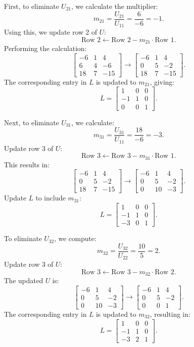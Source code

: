 \documentclass[12pt]{article}
\begin{document}
\begin{enumerate}
First, to eliminate \( U_{21} \), we calculate the multiplier:
\[
m_{21} = \frac{U_{21}}{U_{11}} = \frac{6}{-6} = -1.
\]
Using this, we update row 2 of \( U \):
\[
\text{Row 2} \leftarrow \text{Row 2} - m_{21} \cdot \text{Row 1}.
\]
Performing the calculation:
\[
\begin{bmatrix}
-6 & 1 & 4 \\
6 & 4 & -6 \\
18 & 7 & -15
\end{bmatrix}
\longrightarrow
\begin{bmatrix}
-6 & 1 & 4 \\
0 & 5 & -2 \\
18 & 7 & -15
\end{bmatrix}.
\]
The corresponding entry in \( L \) is updated to \( m_{21} \), giving:
\[
L =
\begin{bmatrix}
1 & 0 & 0 \\
-1 & 1 & 0 \\
0 & 0 & 1
\end{bmatrix}.
\]

Next, to eliminate \( U_{31} \), we calculate:
\[
m_{31} = \frac{U_{31}}{U_{11}} = \frac{18}{-6} = -3.
\]
Update row 3 of \( U \):
\[
\text{Row 3} \leftarrow \text{Row 3} - m_{31} \cdot \text{Row 1}.
\]
This results in:
\[
\begin{bmatrix}
-6 & 1 & 4 \\
0 & 5 & -2 \\
18 & 7 & -15
\end{bmatrix}
\longrightarrow
\begin{bmatrix}
-6 & 1 & 4 \\
0 & 5 & -2 \\
0 & 10 & -3
\end{bmatrix}.
\]
Update \( L \) to include \( m_{31} \):
\[
L =
\begin{bmatrix}
1 & 0 & 0 \\
-1 & 1 & 0 \\
-3 & 0 & 1
\end{bmatrix}.
\]

To eliminate \( U_{32} \), we compute:
\[
m_{32} = \frac{U_{32}}{U_{22}} = \frac{10}{5} = 2.
\]
Update row 3 of \( U \):
\[
\text{Row 3} \leftarrow \text{Row 3} - m_{32} \cdot \text{Row 2}.
\]
The updated \( U \) is:
\[
\begin{bmatrix}
-6 & 1 & 4 \\
0 & 5 & -2 \\
0 & 10 & -3
\end{bmatrix}
\longrightarrow
\begin{bmatrix}
-6 & 1 & 4 \\
0 & 5 & -2 \\
0 & 0 & 1
\end{bmatrix}.
\]
The corresponding entry in \( L \) is updated to \( m_{32} \), resulting in:
\[
L =
\begin{bmatrix}
1 & 0 & 0 \\
-1 & 1 & 0 \\
-3 & 2 & 1
\end{bmatrix}.
\]


\end{enumerate}
\end{document}
